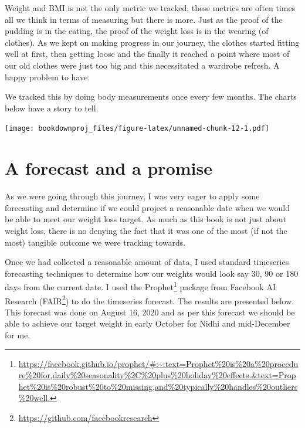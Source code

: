 \documentclass[oneside]{book}
\renewcommand{\href}[2]{#2\footnote{\url{#1}}}
\begin{document}
Weight and BMI is not the only metric we tracked, these metrics are
often times all we think in terms of measuring but there is more. Just
as the proof of the pudding is in the eating, the proof of the weight
loss is in the wearing (of clothes). As we kept on making progress in
our journey, the clothes started fitting well at first, then getting
loose and the finally it reached a point where most of our old clothes
were just too big and this necessitated a wardrobe refresh. A happy
problem to have.

We tracked this by doing body measurements once every few months. The
charts below have a story to tell.

\texttt{[image: bookdownproj\_files/figure-latex/unnamed-chunk-12-1.pdf]}

\section{A forecast and a promise}\label{a-forecast-and-a-promise}

As we were going through this journey, I was very eager to apply some
forecasting and determine if we could project a reasonable date when we
would be able to meet our weight loss target. As much as this book is
not just about weight loss, there is no denying the fact that it was one
of the most (if not the most) tangible outcome we were tracking towards.

Once we had collected a reasonable amount of data, I used standard
timeseries forecasting techniques to determine how our weights would
look say 30, 90 or 180 days from the current date. I used the
\href{https://facebook.github.io/prophet/\#:~:text=Prophet\%20is\%20a\%20procedure\%20for,daily\%20seasonality\%2C\%20plus\%20holiday\%20effects.\&text=Prophet\%20is\%20robust\%20to\%20missing,and\%20typically\%20handles\%20outliers\%20well.}{Prophet}
package from Facebook AI Research
(\href{https://github.com/facebookresearch}{FAIR}) to do the timeseries
forecast. The results are presented below. This forecast was done on
August 16, 2020 and as per this forecast we should be able to achieve
our target weight in early October for Nidhi and mid-December for me.
\end{document}
